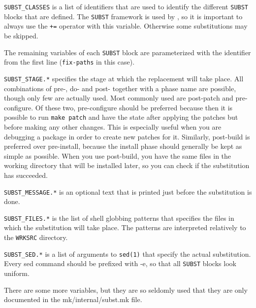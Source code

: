 {\tt SUBST\_CLASSES}  is a list  of identifiers that  are used to  identify the
different {\tt  SUBST} blocks  that are defined.  The {\tt SUBST}  framework is
used by  \robotpkg{}, so it  is important to  always use the {\tt  +=} operator
with this variable. Otherwise some substitutions may be skipped.

The remaining  variables of each {\tt  SUBST} block are  parameterized with the
identifier from the first line ({\tt fix-paths} in this case).

{\tt SUBST\_STAGE.*}  specifies the  stage at which  the replacement  will take
place. All combinations  of pre-, do- and post- together with  a phase name are
possible, though only few are  actually used. Most commonly used are post-patch
and pre-configure. Of these two, pre-configure should be preferred because then
it is possible  to run {\tt make  patch} and have the state  after applying the
patches but before making any other changes. This is especially useful when you
are debugging  a package  in order  to create new  patches for  it.  Similarly,
post-build  is preferred  over pre-install,  because the  install  phase should
generally be kept as simple as  possible. When you use post-build, you have the
same files  in the working directory that  will be installed later,  so you can
check if the substitution has succeeded.

{\tt  SUBST\_MESSAGE.*} is an  optional text  that is  printed just  before the
substitution is  done.

{\tt SUBST\_FILES.*} is the list  of shell globbing patterns that specifies the
files in which the substitution  will take place.  The patterns are interpreted
relatively  to the {\tt WRKSRC}  directory.

{\tt SUBST\_SED.*}  is a  list of  arguments to {\tt  sed(1)} that  specify the
actual substitution.  Every sed command should be prefixed with -e, so that all
{\tt SUBST} blocks look uniform.

There are some more variables, but they are so seldomly used that they are only
documented in the mk/internal/subst.mk file.
